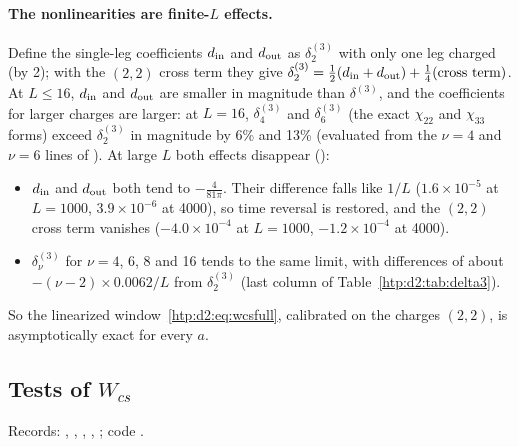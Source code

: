 \paragraph{The nonlinearities are finite-$L$ effects.} Define the single-leg coefficients $d_{\rm in}$ and $d_{\rm out}$ as
$\delta^{(3)}_2$ with only one leg charged (by 2); with the $(2,2)$ cross term they give $\delta^{(3)}_2=\frac12(d_{\rm in}+d_{\rm
out})+\frac14(\text{cross term})$. At $L\le16$, $d_{\rm in}$ and $d_{\rm out}$ are smaller in magnitude than $\delta^{(3)}$, and
the coefficients for larger charges are larger: at $L=16$, $\delta^{(3)}_4$ and $\delta^{(3)}_6$ (the exact $\chi_{22}$ and $\chi_{33}$ forms)
exceed $\delta^{(3)}_2$ in magnitude by 6\% and 13\% (evaluated from the $\nu=4$ and $\nu=6$ lines of
). At large $L$ both effects disappear
():
\begin{itemize}
\item $d_{\rm in}$ and $d_{\rm out}$ both tend to $-\frac4{81\pi}$. Their difference falls like $1/L$ ($1.6\times10^{-5}$ at
 $L=1000$, $3.9\times10^{-6}$ at 4000), so time reversal is restored, and the $(2,2)$ cross term vanishes
 ($-4.0\times10^{-4}$ at $L=1000$, $-1.2\times10^{-4}$ at 4000).
\item $\delta^{(3)}_\nu$ for $\nu=4$, 6, 8 and 16 tends to the same limit, with differences of about $-(\nu-2)\times0.0062/L$ from
 $\delta^{(3)}_2$ (last column of Table~\ref{htp:d2:tab:delta3}).
\end{itemize}
So the linearized window~\eqref{htp:d2:eq:wcsfull}, calibrated on the charges $(2,2)$, is asymptotically exact for every $a$.

\subsection{Tests of \texorpdfstring{$W_{cs}$}{Wcs}}\label{htp:d2:app:wcstests}
{\small\raggedright\noindent Records: ,
, ,
, ; code .\par}

